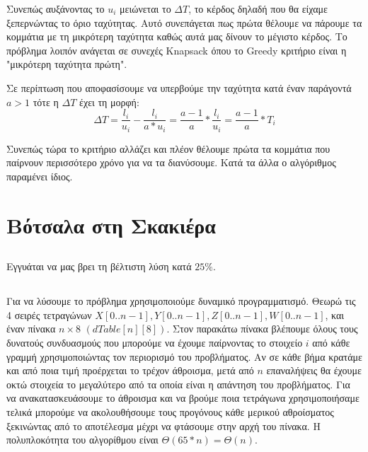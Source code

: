 \documentclass[a4paper,10pt]{article} \usepackage{anysize}
\begin{document}
Συνεπώς αυξάνοντας το $u_i$ μειώνεται το $\Delta{T}$, το κέρδος δηλαδή που θα
είχαμε ξεπερνώντας το όριο ταχύτητας. Αυτό συνεπάγεται πως πρώτα θέλουμε να
πάρουμε τα κομμάτια με τη μικρότερη ταχύτητα καθώς αυτά μας δίνουν το μέγιστο
κέρδος. Το πρόβλημα λοιπόν ανάγεται σε συνεχές Knapsack όπου το Greedy
κριτήριο είναι η "μικρότερη ταχύτητα πρώτη".

Σε περίπτωση που αποφασίσουμε να υπερβούμε την ταχύτητα κατά έναν παράγοντά
$a>1$ τότε η $\Delta{T}$ έχει τη μορφή:
\[
	\Delta{T}=\frac{l_i}{u_i} - \frac{l_i}{a*u_i} =
	\frac{a-1}{a}*\frac{l_i}{u_i} = \frac{a-1}{a}*T_i
\] 

Συνεπώς τώρα το κριτήριο αλλάζει και πλέον θέλουμε πρώτα τα κομμάτια που
παίρνουν περισσότερο χρόνο για να τα διανύσουμε. Κατά τα άλλα ο αλγόριθμος
παραμένει ίδιος.
\section{Βότσαλα στη Σκακιέρα}
\subsection{} Εγγυάται να μας βρει τη βέλτιστη λύση κατά $25\%$.
\subsection{} Για να λύσουμε το πρόβλημα χρησιμοποιούμε δυναμικό προγραμματισμό. Θεωρώ τις 4 σειρές
τετραγώνων $X[0..n-1],Y[0..n-1],Z[0..n-1],W[0..n-1]$, και έναν πίνακα
$n\times8$ $(dTable[n][8])$. Στον παρακάτω πίνακα βλέπουμε
όλους τους δυνατούς συνδυασμούς που μπορούμε να έχουμε παίρνοντας το στοιχείο
$i$ από κάθε γραμμή χρησιμοποιώντας τον περιορισμό του προβλήματος. Αν σε κάθε
βήμα κρατάμε και από ποια τιμή προέρχεται το τρέχον άθροισμα, μετά από $n$
επαναλήψεις θα έχουμε οκτώ στοιχεία το μεγαλύτερο από τα οποία είναι η
απάντηση του προβλήματος. Για να ανακατασκευάσουμε το άθροισμα και να βρούμε
ποια τετράγωνα χρησιμοποιήσαμε τελικά μπορούμε να ακολουθήσουμε τους προγόνους
κάθε μερικού αθροίσματος ξεκινώντας από το αποτέλεσμα μέχρι να φτάσουμε στην
αρχή του πίνακα. Η πολυπλοκότητα του αλγορίθμου είναι
$\Theta{(65*n)}=\Theta{(n)}$.
\end{document}
